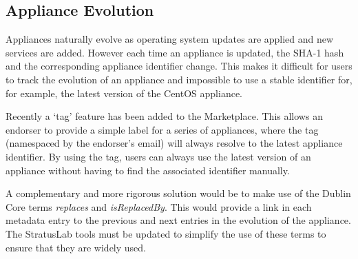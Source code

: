 \subsection{Appliance Evolution}

Appliances naturally evolve as operating system updates are applied
and new services are added.  However each time an appliance is
updated, the SHA-1 hash and the corresponding appliance identifier
change.  This makes it difficult for users to track the evolution of
an appliance and impossible to use a stable identifier for, for
example, the latest version of the CentOS appliance.

Recently a `tag' feature has been added to the Marketplace\@.  This
allows an endorser to provide a simple label for a series of
appliances, where the tag (namespaced by the endorser's email) will
always resolve to the latest appliance identifier.  By using the tag,
users can always use the latest version of an appliance without having
to find the associated identifier manually.

A complementary and more rigorous solution would be to make use of the
Dublin Core terms \emph{replaces} and \emph{isReplacedBy}. This would
provide a link in each metadata entry to the previous and next entries
in the evolution of the appliance.  The StratusLab tools must be
updated to simplify the use of these terms to ensure that they are
widely used.
